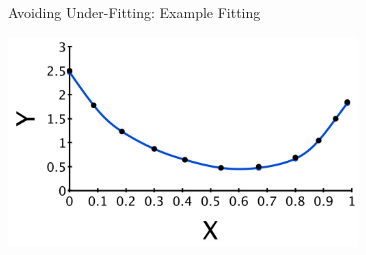 \documentclass[aspectratio=169]{beamer}
\begin{document}
\begin{frame}{Avoiding Under-Fitting: Example Fitting}

\vspace{1em}
\includegraphics[height=15em]{./lectReg/OverUnderDataFit2.pdf}
\end{frame}

\end{document}
